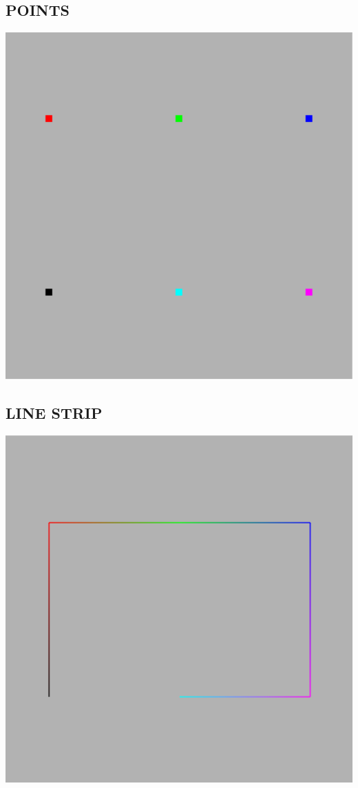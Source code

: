 \documentclass{report}
\begin{document}
\subsection{POINTS}
\includegraphics[width=1.0\textwidth]{Image_1}
\subsection{LINE STRIP}
\includegraphics[width=1.0\textwidth]{Image_0}
\end{document}
